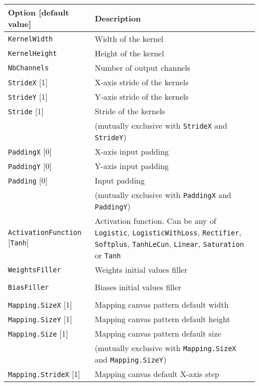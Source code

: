\documentclass[a4paper,11pt,oneside]{article}
\begin{document}
\begin{center}
 \begin{longtable}{| p{5cm} | p{10cm} | }
 \hline
 Option [default value] & Description\\
 \hline\hline
  \cellcolor{requiredcolor}\lstinline!KernelWidth! & Width of the kernel \\
  \cellcolor{requiredcolor}\lstinline!KernelHeight! & Height of the kernel \\
  \cellcolor{requiredcolor}\lstinline!NbChannels! & Number of output channels \\
  \lstinline!StrideX! [1] & X-axis stride of the kernels \\
  \lstinline!StrideY! [1] & Y-axis stride of the kernels \\
  \lstinline!Stride! [1] & Stride of the kernels \\
   & (mutually exclusive with \lstinline!StrideX! and \lstinline!StrideY!) \\
  \lstinline!PaddingX! [0] & X-axis input padding \\
  \lstinline!PaddingY! [0] & Y-axis input padding \\
  \lstinline!Padding! [0] & Input padding \\
   & (mutually exclusive with \lstinline!PaddingX! and \lstinline!PaddingY!) \\
  \lstinline!ActivationFunction! [\lstinline!Tanh!] & Activation function.
  Can be any of \lstinline!Logistic!,  \lstinline!LogisticWithLoss!,
  \lstinline!Rectifier!, \lstinline!Softplus!, \lstinline!TanhLeCun!,
  \lstinline!Linear!, \lstinline!Saturation! or \lstinline!Tanh! \\
  \lstinline!WeightsFiller! & Weights initial values filler \\
   & \\
  \lstinline!BiasFiller! & Biases initial values filler \\
   & \\
  \lstinline!Mapping.SizeX! [1] & Mapping canvas pattern default width \\
  \lstinline!Mapping.SizeY! [1] & Mapping canvas pattern default height \\
  \lstinline!Mapping.Size! [1] & Mapping canvas pattern default size \\
   & (mutually exclusive with \lstinline!Mapping.SizeX!
   and \lstinline!Mapping.SizeY!) \\
  \lstinline!Mapping.StrideX! [1] & Mapping canvas default X-axis step \\

\end{longtable}
\end{center}
\end{document}
